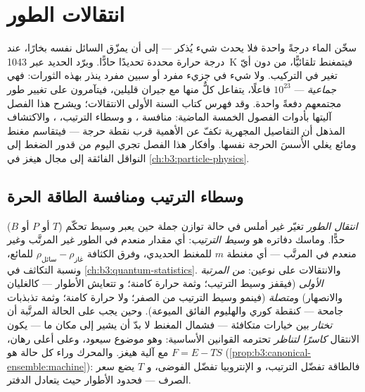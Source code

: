 \chapter{انتقالات الطور}\label{ch:b3:phase-transitions}

سخّن الماء درجةً واحدة فلا يحدث شيء يُذكر --- إلى أن يمزّق السائل
نفسه بخارًا، عند درجة حرارة محددة تحديدًا حادًّا.
وبرّد الحديد عبر \qty{1043}{K} فيتمغنط تلقائيًّا، من دون
أيّ تغير في التركيب. ولا شيء في جزيء مفرد أو
سبين مفرد ينذر بهذه الثورات: فهي \emph{جماعية}
--- $10^{23}$ فاعلًا، يتفاعل كلٌّ منها مع جيران قليلين،
فيتآمرون على تغيير طور مجتمعهم دفعةً واحدة. وقد فهرس كتاب
السنة الأولى الانتقالات؛ ويشرح هذا الفصل آليتها
بأدوات الفصول الخمسة الماضية: منافسة ، و
وسطاء الترتيب، ، والاكتشاف
المذهل أن التفاصيل المجهرية تكفّ عن الأهمية قرب نقطة
حرجة --- فيتقاسم مغنط ومائع يغلي الأُسسَ الحرجة نفسها.
وأفكار هذا الفصل تجري اليوم من قدور الضغط
إلى النواقل الفائقة إلى مجال هيغز في
\cref{ch:b3:particle-physics}.

\section{وسطاء الترتيب ومنافسة الطاقة الحرة}

\begin{definition}\label{def:b3:phase-transitions:order}
\emph{انتقال الطور} تغيّر غير أملس في حالة توازن
جملة حين يعبر وسيط تحكّم ($T$ أو $P$ أو $B$)
حدًّا. وماسك دفاتره هو \emph{وسيط الترتيب}: أي مقدار
منعدم في الطور غير المرتَّب وغير منعدم في المرتَّب --- أي
مغنطة $m$ للمغنط الحديدي، وفرق الكثافة
$\rho_{\text{سائل}} - \rho_{\text{غاز}}$ للمائع، ونسبة
التكاثف في \cref{ch:b3:quantum-statistics}. والانتقالات على
نوعين: \emph{من المرتبة الأولى} (فيقفز وسيط الترتيب؛ وثمة حرارة كامنة؛ و
تتعايش الأطوار --- كالغليان والانصهار) و\emph{متصلة} (فينمو وسيط
الترتيب من الصفر؛ ولا حرارة كامنة؛ وثمة تذبذبات جامحة ---
كنقطة كوري  والهليوم الفائق الميوعة). وحين يجب على
الحالة المرتَّبة أن \emph{تختار} بين خيارات متكافئة --- فشمال
المغنط لا بدّ أن يشير إلى مكان ما --- يكون الانتقال
\emph{كاسرًا لتناظر} تحترمه القوانين الأساسية: وهو موضوع
سيعود، وعلى أعلى رهان، مع آلية هيغز.
والمحرك وراء كل حالة هو  $F = E - TS$
(\cref{prop:b3:canonical-ensemble:machine}): فالطاقة تفضّل الترتيب، و
الإنتروبيا تفضّل الفوضى، و $T$ يضع سعر الصرف --- فحدود
الأطوار حيث يتعادل الدفتر.
\end{definition}

